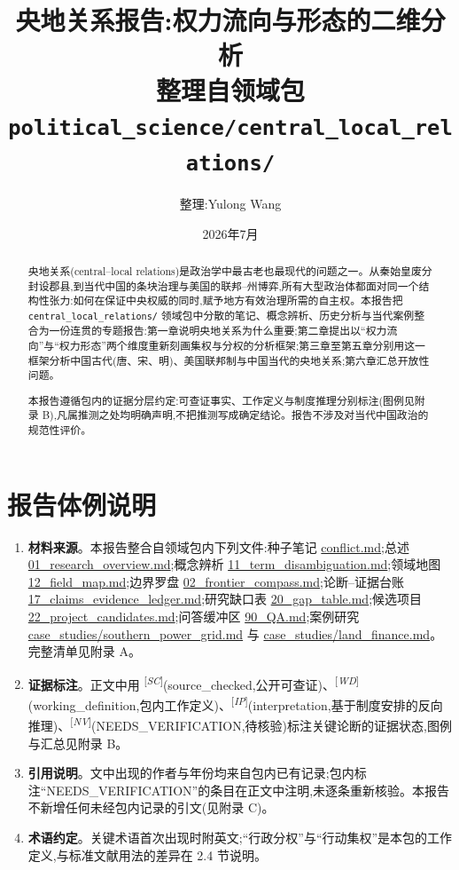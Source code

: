 \documentclass[UTF8,12pt,a4paper]{ctexrep}
\newcommand{\src}[1]{\textsuperscript{[\emph{#1}]}}
\begin{document}
\title{{\bfseries 央地关系报告:权力流向与形态的二维分析}\\[0.6em]
  \large 整理自领域包 \texttt{political\_science/central\_local\_relations/}}
\author{整理:Yulong Wang}
\date{2026年7月}
\maketitle

\begin{abstract}
央地关系(central--local relations)是政治学中最古老也最现代的问题之一。从秦始皇废分封设郡县,到当代中国的条块治理与美国的联邦--州博弈,所有大型政治体都面对同一个结构性张力:如何在保证中央权威的同时,赋予地方有效治理所需的自主权。本报告把 \texttt{central\_local\_relations/} 领域包中分散的笔记、概念辨析、历史分析与当代案例整合为一份连贯的专题报告:第一章说明央地关系为什么重要;第二章提出以``权力流向''与``权力形态''两个维度重新刻画集权与分权的分析框架;第三章至第五章分别用这一框架分析中国古代(唐、宋、明)、美国联邦制与中国当代的央地关系;第六章汇总开放性问题。

本报告遵循包内的证据分层约定:可查证事实、工作定义与制度推理分别标注(图例见附录 B),凡属推测之处均明确声明,不把推测写成确定结论。报告不涉及对当代中国政治的规范性评价。
\end{abstract}

\tableofcontents

\section*{报告体例说明}

{\sloppy
\begin{enumerate}[label=(\arabic*)]
  \item \textbf{材料来源}。本报告整合自领域包内下列文件:种子笔记 \url{conflict.md};总述 \url{01_research_overview.md};概念辨析 \url{11_term_disambiguation.md};领域地图 \url{12_field_map.md};边界罗盘 \url{02_frontier_compass.md};论断--证据台账 \url{17_claims_evidence_ledger.md};研究缺口表 \url{20_gap_table.md};候选项目 \url{22_project_candidates.md};问答缓冲区 \url{90_QA.md};案例研究 \url{case_studies/southern_power_grid.md} 与 \url{case_studies/land_finance.md}。完整清单见附录 A。
  \item \textbf{证据标注}。正文中用 \src{SC}(source\_checked,公开可查证)、\src{WD}(working\_definition,包内工作定义)、\src{IP}(interpretation,基于制度安排的反向推理)、\src{NV}(NEEDS\_VERIFICATION,待核验)标注关键论断的证据状态,图例与汇总见附录 B。
  \item \textbf{引用说明}。文中出现的作者与年份均来自包内已有记录;包内标注``NEEDS\_VERIFICATION''的条目在正文中注明,未逐条重新核验。本报告不新增任何未经包内记录的引文(见附录 C)。
  \item \textbf{术语约定}。关键术语首次出现时附英文;``行政分权''与``行动集权''是本包的工作定义,与标准文献用法的差异在 2.4 节说明。
\end{enumerate}
}
\end{document}
